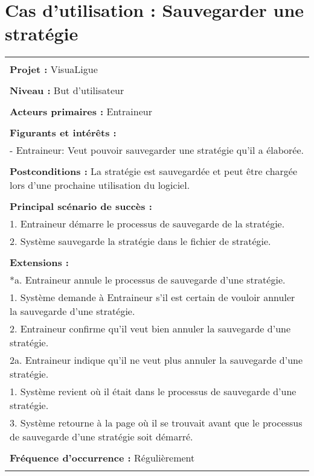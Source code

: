 \section{Cas d'utilisation : Sauvegarder une stratégie}
\begin{longtable}{|p{16cm}|}
	\hline
	\\
	\textbf{Projet :} VisuaLigue\\
	\\
	\textbf{Niveau :} But d'utilisateur\\
	\\
	\textbf{Acteurs primaires :} Entraineur\\
	\\
	\textbf{Figurants et intérêts :} \\
	- Entraineur: Veut pouvoir sauvegarder une stratégie qu'il a élaborée.\\
	\\
	\textbf{Postconditions :} La stratégie est sauvegardée et peut être chargée lors d'une prochaine utilisation du logiciel.\\
	\\
	\textbf{Principal scénario de succès :}\\
	1. Entraineur démarre le processus de sauvegarde de la stratégie.\\
	2. Système sauvegarde la stratégie dans le fichier de stratégie.\\
	\\
	\textbf{Extensions :}\\
	*a. Entraineur annule le processus de sauvegarde d'une stratégie.\\
	\hspace{1cm}1. Système demande à Entraineur s'il est certain de vouloir annuler la sauvegarde d'une stratégie.\\
	\hspace{1cm}2. Entraineur confirme qu'il veut bien annuler la sauvegarde d'une stratégie.\\
	\hspace{2cm}2a. Entraineur indique qu'il ne veut plus annuler la sauvegarde d'une stratégie.\\
	\hspace{3cm}1. Système revient où il était dans le processus de sauvegarde d'une stratégie.\\
	\hspace{1cm}3. Système retourne à la page où il se trouvait avant que le processus de sauvegarde d'une stratégie soit démarré.\\
	\\
	\textbf{Fréquence d'occurrence :} Régulièrement\\
	\\
	\hline
\end{longtable}

